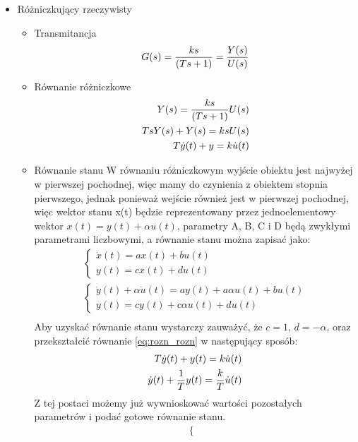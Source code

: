 \documentclass[a4paper,10pt]{article}
\begin{document}
\begin{itemize}
\item Różniczkujący rzeczywisty
\begin{itemize}
\item Transmitancja
	\begin{eqnarray}
		G(s)= {ks \over \left({Ts + 1}\right)} = {Y(s) \over U(s)}
	\end{eqnarray}
\item Równanie różniczkowe
	\begin{eqnarray}
		\nonumber Y(s) = {ks \over \left({Ts + 1}\right)}  U(s)\\
		\nonumber TsY(s)+Y(s)=k s U(s)\\
		T\dot{y}(t)+y=k\dot{u}(t) \label{eq:rozn_rozn}
	\end{eqnarray}
\item Równanie stanu
\newline W równaniu różniczkowym wyjście obiektu jest najwyżej w pierwszej pochodnej, więc mamy do czynienia z obiektem stopnia pierwszego, jednak ponieważ wejście również jest w pierwszej pochodnej, więc wektor stanu x(t) będzie reprezentowany przez jednoelementowy wektor $x(t) = y(t) + \alpha u(t)$, parametry A, B, C i D będą zwykłymi parametrami liczbowymi, a równanie stanu można zapisać jako:
	\begin{eqnarray}
		\nonumber \left\{ \begin{array}{l}
			\dot{x}(t) = ax(t) + bu(t)\\
			y(t) = cx(t) + du(t)
		\end{array} \right.\\
		\nonumber \left\{ \begin{array}{l}
			\dot{y}(t) + \alpha \dot{u}(t) = ay(t) + a\alpha u(t) + bu(t)\\
			y(t) = cy(t) + c\alpha u(t) + du(t)
		\end{array} \right.\\
	\end{eqnarray}
Aby uzyskać równanie stanu wystarczy zauważyć, że $c=1$, $d = -\alpha$, oraz przekształcić równanie \ref{eq:rozn_rozn} w następujący sposób:
	\begin{eqnarray}
		\nonumber T\dot{y}(t) + y(t) = k\dot{u}(t)\\
		\dot{y}(t) + {1 \over T}y(t) = {k \over T}\dot{u}(t)
	\end{eqnarray}
Z tej postaci możemy już wywnioskować wartości pozostałych parametrów i podać gotowe równanie stanu.
	\begin{eqnarray}
		\left\{ \begin{array}{l}

\end{array}
\end{eqnarray}
\end{itemize}
\end{itemize}
\end{document}
